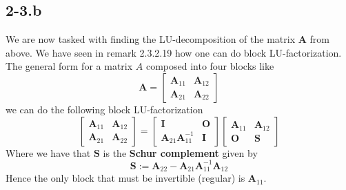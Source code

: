 \documentclass{article}
\begin{document}
\subsection*{2-3.b}
We are now tasked with finding the LU-decomposition of the matrix $\mathbf{A}$ from above. We have seen in remark 2.3.2.19 how one can do block LU-factorization. The general form for a matrix $A$ composed into four blocks like
\begin{equation*}
    \mathbf{A} = \begin{bmatrix}
        \mathbf{A}_{11} & \mathbf{A}_{12} \\
        \mathbf{A}_{21} & \mathbf{A}_{22}
    \end{bmatrix}
\end{equation*}
we can do the following block LU-factorization 
\begin{equation*}
  \begin{bmatrix}
        \mathbf{A}_{11} & \mathbf{A}_{12} \\
        \mathbf{A}_{21} & \mathbf{A}_{22}
    \end{bmatrix}  =
    \begin{bmatrix}
        \mathbf{I} & \mathbf{O} \\
        \mathbf{A}_{21}\mathbf{A}_{11}^{-1} & \mathbf{I}
    \end{bmatrix}
    \begin{bmatrix}
        \mathbf{A}_{11} & \mathbf{A}_{12} \\
        \mathbf{O} & \mathbf{S}
    \end{bmatrix}
\end{equation*}
Where we have that $\mathbf{S}$ is the \textbf{Schur complement} given by
\begin{equation*}
    \mathbf{S} := \mathbf{A}_{22} - \mathbf{A}_{21}\mathbf{A}_{11}^{-1}\mathbf{A}_{12}
\end{equation*}
Hence the only block that must be invertible (regular) is $\mathbf{A}_{11}$.

\pagebreak
\end{document}
